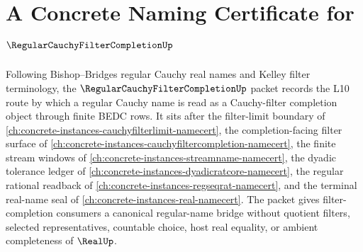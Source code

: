 \chapter{A Concrete Naming Certificate for $\RegularCauchyFilterCompletionUp$}
\label{ch:concrete-instances-regular-cauchy-filter-completion-namecert}

Following Bishop--Bridges regular Cauchy real names and Kelley filter terminology, the $\RegularCauchyFilterCompletionUp$ packet records the L10 route by which a regular Cauchy name is read as a Cauchy-filter completion object through finite BEDC rows. It sits after the filter-limit boundary of \autoref{ch:concrete-instances-cauchyfilterlimit-namecert}, the completion-facing filter surface of \autoref{ch:concrete-instances-cauchyfiltercompletion-namecert}, the finite stream windows of \autoref{ch:concrete-instances-streamname-namecert}, the dyadic tolerance ledger of \autoref{ch:concrete-instances-dyadicratcore-namecert}, the regular rational readback of \autoref{ch:concrete-instances-regseqrat-namecert}, and the terminal real-name seal of \autoref{ch:concrete-instances-real-namecert}. The packet gives filter-completion consumers a canonical regular-name bridge without quotient filters, selected representatives, countable choice, host real equality, or ambient completeness of $\RealUp$.

